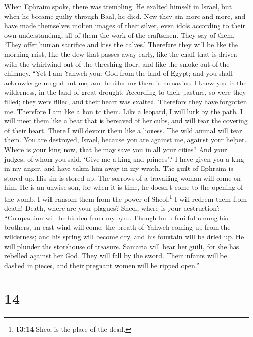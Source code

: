  When Ephraim spoke, there was trembling. He exalted
himself in Israel, but when he became guilty through Baal, he died.
 Now they sin more and more, and have made themselves
molten images of their silver, even idols according to their own
understanding, all of them the work of the craftsmen. They say of them,
`They offer human sacrifice and kiss the calves.' 
Therefore they will be like the morning mist, like the dew that passes
away early, like the chaff that is driven with the whirlwind out of the
threshing floor, and like the smoke out of the chimney. 
``Yet I am Yahweh your God from the land of Egypt; and you shall
acknowledge no god but me, and besides me there is no savior.
 I knew you in the wilderness, in the land of great
drought.  According to their pasture, so were they filled;
they were filled, and their heart was exalted. Therefore they have
forgotten me.  Therefore I am like a lion to them. Like a
leopard, I will lurk by the path.  I will meet them like a
bear that is bereaved of her cubs, and will tear the covering of their
heart. There I will devour them like a lioness. The wild animal will
tear them.  You are destroyed, Israel, because you are
against me, against your helper.  Where is your king now,
that he may save you in all your cities? And your judges, of whom you
said, `Give me a king and princes'?  I have given you a
king in my anger, and have taken him away in my wrath. 
The guilt of Ephraim is stored up. His sin is stored up. 
The sorrows of a travailing woman will come on him. He is an unwise son,
for when it is time, he doesn't come to the opening of the womb.
 I will ransom them from the power of Sheol.\footnote{\textbf{13:14}
  Sheol is the place of the dead.} I will redeem them from death! Death,
where are your plagues? Sheol, where is your destruction? ``Compassion
will be hidden from my eyes.  Though he is fruitful among
his brothers, an east wind will come, the breath of Yahweh coming up
from the wilderness; and his spring will become dry, and his fountain
will be dried up. He will plunder the storehouse of treasure.
 Samaria will bear her guilt, for she has rebelled
against her God. They will fall by the sword. Their infants will be
dashed in pieces, and their pregnant women will be ripped open.''

\hypertarget{section-13}{%
\section{14}\label{section-13}}

